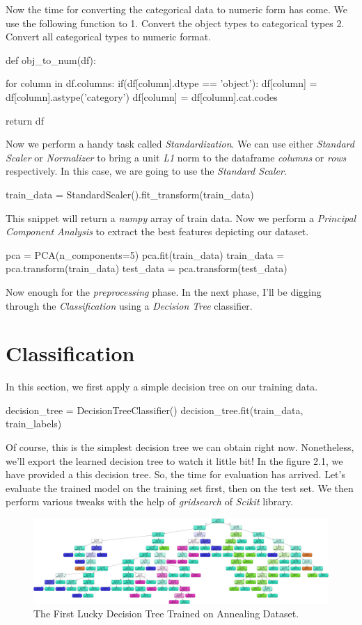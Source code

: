 \documentclass[12pt]{article}
\numberwithin{equation}{section}
\numberwithin{table}{section}
\numberwithin{figure}{section}
\begin{document}
Now the time for converting the categorical data to numeric form has come. We use the following function to 1. Convert the object types to categorical types 2. Convert all categorical types to numeric format.
\begin{python}
	def obj_to_num(df):
	
	for column in df.columns:
		if(df[column].dtype == 'object'):
			df[column] = df[column].astype('category')
			df[column] = df[column].cat.codes
	
	return df
\end{python} 
Now we perform a handy task called \textit{Standardization}. We can use either \textit{Standard Scaler} or \textit{Normalizer} to bring a unit \textit{L1} norm to the dataframe \textit{columns} or \textit{rows} respectively. In this case, we are going to use the \textit{Standard Scaler}.
\begin{python}
	train_data = StandardScaler().fit_transform(train_data)
\end{python}
This snippet will return a \textit{numpy} array of train data. Now we perform a \textit{Principal Component Analysis} to extract the best features depicting our dataset.
\begin{python}
	pca = PCA(n_components=5)
	pca.fit(train_data)
	train_data = pca.transform(train_data)
	test_data = pca.transform(test_data)
\end{python}
Now enough for the \textit{preprocessing} phase. In the next phase, I'll be digging through the \textit{Classification} using a \textit{Decision Tree} classifier.

\section{Classification}
In this section, we first apply a simple decision tree on our training data.
\begin{python}
	decision_tree = DecisionTreeClassifier()
	decision_tree.fit(train_data, train_labels)
\end{python}
Of course, this is the simplest decision tree we can obtain right now. Nonetheless, we'll export the learned decision tree to watch it little bit! In the figure 2.1, we have provided a this decision tree. So, the time for evaluation has arrived. Let's evaluate the trained model on the training set first, then on the test set. We then perform various tweaks with the help of \textit{gridsearch} of \textit{Scikit} library.

\newpage
\begin{figure}
	\includegraphics[width=\textwidth]{dt1.png}
	\caption{The First Lucky Decision Tree Trained on Annealing Dataset.}
	\label{fig:PropProf}
\end{figure}
\end{document}
